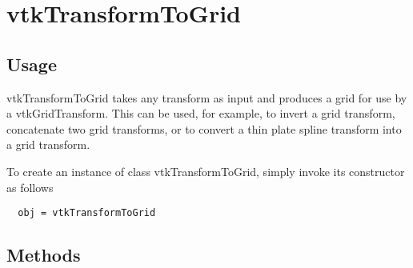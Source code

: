 \section{vtkTransformToGrid}

\subsection{Usage}

 vtkTransformToGrid takes any transform as input and produces a grid
 for use by a vtkGridTransform.  This can be used, for example, to 
 invert a grid transform, concatenate two grid transforms, or to
 convert a thin plate spline transform into a grid transform.

To create an instance of class vtkTransformToGrid, simply
invoke its constructor as follows
\begin{verbatim}
  obj = vtkTransformToGrid
\end{verbatim}
\subsection{Methods}

